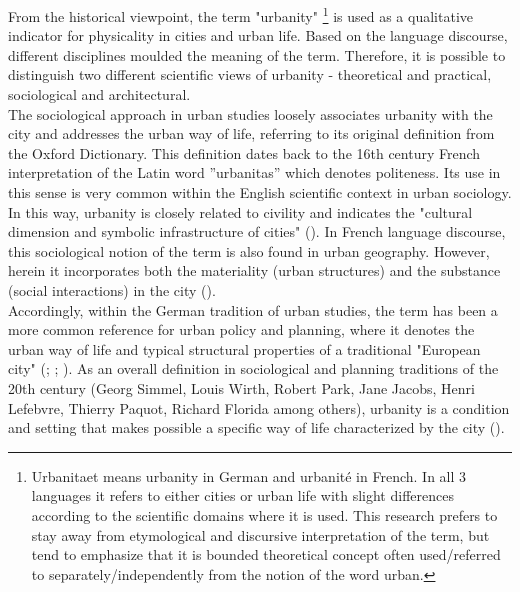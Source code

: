 \documentclass[11pt]{report}
\begin{document}
{{{From the historical viewpoint, the term "urbanity"
\footnote{Urbanitaet means urbanity in German and urbanité in French. In all 3 languages it refers to either cities or urban life with slight differences according to the scientific domains where it is used.
This research prefers to stay away from etymological and discursive interpretation of the term, but tend to emphasize that it is bounded theoretical concept often used/referred to separately/independently from the notion of the word urban.}
is used as a qualitative indicator for physicality in cities and urban life. 
Based on the language discourse, different disciplines moulded the meaning of the term.
Therefore, it is possible to distinguish two different scientific views of urbanity - theoretical and practical, sociological and architectural.
\\

The sociological approach in urban studies loosely associates urbanity with the city and addresses the urban way of life, referring to its original definition from the Oxford Dictionary. This definition dates back to the 16th century French interpretation of the Latin word ”urbanitas” which denotes politeness. Its use in this sense is very common within the English scientific context in urban sociology. In this way, urbanity is closely related to civility and indicates the "cultural dimension and symbolic infrastructure of cities" (\href{Zijderveld}{\citealt{zijderveld_theory_2011}}).
In French language discourse, this sociological notion of the term is also found in urban geography. However, herein it incorporates both the materiality (urban structures) and the substance (social interactions) in the city (\citealt{Bisson 2016}). 
\\

Accordingly, within the German tradition of urban studies, the term has been a more common reference for urban policy and planning, where it denotes the urban way of life and typical structural properties of a traditional "European city" (\href{Prigge}{\citealt{Prigge_urbanitaet_1996}}; \href{wust}{\citealt{wust_urbanity_2005}}; \href{Lossau}{\citealt{lossau_new_2008}}). 
As an overall definition in sociological and planning traditions of the 20th century (Georg Simmel, Louis Wirth, Robert Park, Jane Jacobs, Henri Lefebvre, Thierry Paquot, Richard Florida among others), urbanity is a condition and setting that makes possible a specific way of life characterized by the city (\href{levy}{\cite{Lévy 2013}}). 
\\

}}}
\end{document}
